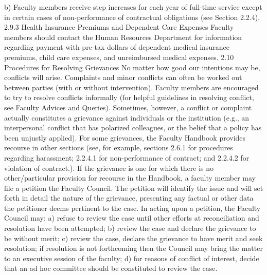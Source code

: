 \documentclass[letterpaper, 11pt]{article}
\begin{document}
	b) Faculty members receive step increases for each year of full-time service except in certain cases of non-performance of contractual obligations (see Section 2.2.4).
	2.9.3 Health Insurance Premiums and Dependent Care Expenses
	Faculty members should contact the Human Resources Department for information regarding payment with pre-tax dollars of dependent medical insurance premiums, child care expenses, and unreimbursed medical expenses.
	2.10 Procedures for Resolving Grievances
	No matter how good our intentions may be, conflicts will arise.  Complaints and minor conflicts can often be worked out between parties (with or without intervention).  Faculty members are encouraged to try to resolve conflicts informally (for helpful guidelines in resolving conflict, see Faculty Advices and Queries).
	Sometimes, however, a conflict or complaint actually constitutes a grievance against individuals or the institution (e.g., an interpersonal conflict that has polarized colleagues, or the belief that a policy has been unjustly applied).  For some grievances, the Faculty Handbook provides recourse in other sections (see, for example, sections 2.6.1 for procedures regarding harassment; 2.2.4.1 for non-performance of contract; and 2.2.4.2 for violation of contract.).
	If the grievance is one for which there is no other/particular provision for recourse in the Handbook, a faculty member may file a petition the Faculty Council.  The petition will identify the issue and will set forth in detail the nature of the grievance, presenting any factual or other data the petitioner deems pertinent to the case.  In acting upon a petition, the Faculty Council may:
	a) refuse to review the case until other efforts at reconciliation and resolution have been attempted;
	b) review the case and declare the grievance to be without merit;
	c) review the case, declare the grievance to have merit and seek resolution; if resolution is not forthcoming then the Council may bring the matter to an executive session of the faculty;
	d) for reasons of conflict of interest, decide that an ad hoc committee should be constituted to review the case.
\end{document}
